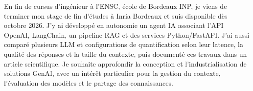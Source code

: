 
\begin{cvparagraph}
En fin de cursus d’ingénieur à l’ENSC, école de Bordeaux INP, je viens de terminer mon stage de fin d’études à Inria Bordeaux et suis disponible dès octobre 2026. J’y ai développé en autonomie un agent IA associant l’API OpenAI, LangChain, un pipeline RAG et des services Python/FastAPI. J’ai aussi comparé plusieurs LLM et configurations de quantification selon leur latence, la qualité des réponses et la taille du contexte, puis documenté ces travaux dans un article scientifique. Je souhaite approfondir la conception et l’industrialisation de solutions GenAI, avec un intérêt particulier pour la gestion du contexte, l’évaluation des modèles et le partage des connaissances.
\end{cvparagraph}
